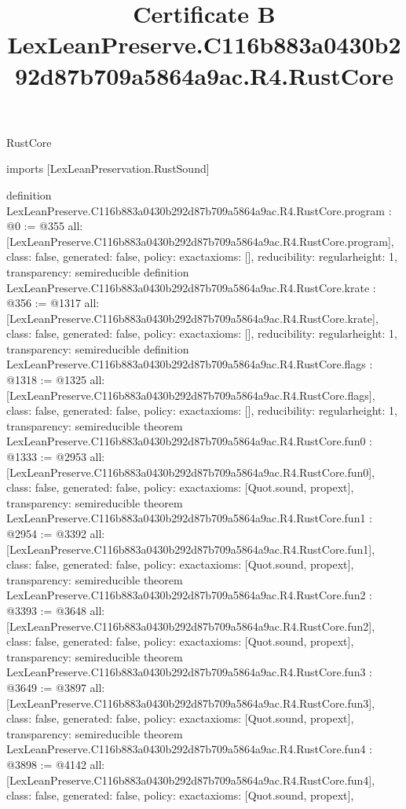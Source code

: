 \begin{lexlean}{RustCore}
\title{Certificate B LexLeanPreserve.C116b883a0430b292d87b709a5864a9ac.R4.RustCore}
\begin{coremodule}
imports [LexLeanPreservation.RustSound]

definition LexLeanPreserve.C116b883a0430b292d87b709a5864a9ac.R4.RustCore.program : @0 := @355 {
  all: [LexLeanPreserve.C116b883a0430b292d87b709a5864a9ac.R4.RustCore.program],
  class: false,
  generated: false,
  policy: exact{axioms: []},
  reducibility: regular{height: 1},
  transparency: semireducible
}
definition LexLeanPreserve.C116b883a0430b292d87b709a5864a9ac.R4.RustCore.krate : @356 := @1317 {
  all: [LexLeanPreserve.C116b883a0430b292d87b709a5864a9ac.R4.RustCore.krate],
  class: false,
  generated: false,
  policy: exact{axioms: []},
  reducibility: regular{height: 1},
  transparency: semireducible
}
definition LexLeanPreserve.C116b883a0430b292d87b709a5864a9ac.R4.RustCore.flags : @1318 := @1325 {
  all: [LexLeanPreserve.C116b883a0430b292d87b709a5864a9ac.R4.RustCore.flags],
  class: false,
  generated: false,
  policy: exact{axioms: []},
  reducibility: regular{height: 1},
  transparency: semireducible
}
theorem LexLeanPreserve.C116b883a0430b292d87b709a5864a9ac.R4.RustCore.fun0 : @1333 := @2953 {
  all: [LexLeanPreserve.C116b883a0430b292d87b709a5864a9ac.R4.RustCore.fun0],
  class: false,
  generated: false,
  policy: exact{axioms: [Quot.sound, propext]},
  transparency: semireducible
}
theorem LexLeanPreserve.C116b883a0430b292d87b709a5864a9ac.R4.RustCore.fun1 : @2954 := @3392 {
  all: [LexLeanPreserve.C116b883a0430b292d87b709a5864a9ac.R4.RustCore.fun1],
  class: false,
  generated: false,
  policy: exact{axioms: [Quot.sound, propext]},
  transparency: semireducible
}
theorem LexLeanPreserve.C116b883a0430b292d87b709a5864a9ac.R4.RustCore.fun2 : @3393 := @3648 {
  all: [LexLeanPreserve.C116b883a0430b292d87b709a5864a9ac.R4.RustCore.fun2],
  class: false,
  generated: false,
  policy: exact{axioms: [Quot.sound, propext]},
  transparency: semireducible
}
theorem LexLeanPreserve.C116b883a0430b292d87b709a5864a9ac.R4.RustCore.fun3 : @3649 := @3897 {
  all: [LexLeanPreserve.C116b883a0430b292d87b709a5864a9ac.R4.RustCore.fun3],
  class: false,
  generated: false,
  policy: exact{axioms: [Quot.sound, propext]},
  transparency: semireducible
}
theorem LexLeanPreserve.C116b883a0430b292d87b709a5864a9ac.R4.RustCore.fun4 : @3898 := @4142 {
  all: [LexLeanPreserve.C116b883a0430b292d87b709a5864a9ac.R4.RustCore.fun4],
  class: false,
  generated: false,
  policy: exact{axioms: [Quot.sound, propext]},
}
\end{coremodule}
\end{lexlean}
